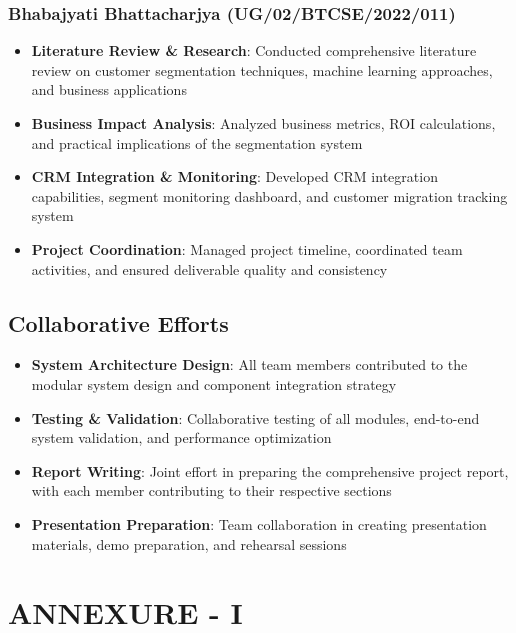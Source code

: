\documentclass[12pt,a4paper]{report}
\begin{document}
\subsection*{Bhabajyati Bhattacharjya (UG/02/BTCSE/2022/011)}
\begin{itemize}
    \item \textbf{Literature Review \& Research}: Conducted comprehensive literature review on customer segmentation techniques, machine learning approaches, and business applications
    \item \textbf{Business Impact Analysis}: Analyzed business metrics, ROI calculations, and practical implications of the segmentation system
    \item \textbf{CRM Integration \& Monitoring}: Developed CRM integration capabilities, segment monitoring dashboard, and customer migration tracking system
    \item \textbf{Project Coordination}: Managed project timeline, coordinated team activities, and ensured deliverable quality and consistency
\end{itemize}

\section*{Collaborative Efforts}
\begin{itemize}
    \item \textbf{System Architecture Design}: All team members contributed to the modular system design and component integration strategy
    \item \textbf{Testing \& Validation}: Collaborative testing of all modules, end-to-end system validation, and performance optimization
    \item \textbf{Report Writing}: Joint effort in preparing the comprehensive project report, with each member contributing to their respective sections
    \item \textbf{Presentation Preparation}: Team collaboration in creating presentation materials, demo preparation, and rehearsal sessions
\end{itemize}

\newpage

\chapter*{\textbf{ANNEXURE - I}}
\end{document}
